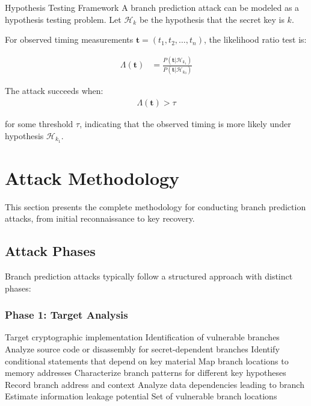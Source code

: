 \documentclass[11pt,a4paper]{article}
\theoremstyle{definition}
\begin{document}
\begin{mathematicsbox}{Hypothesis Testing Framework}
A branch prediction attack can be modeled as a hypothesis testing problem. Let $\mathcal{H}_k$ be the hypothesis that the secret key is $k$.

For observed timing measurements $\mathbf{t} = (t_1, t_2, \ldots, t_n)$, the likelihood ratio test is:

\begin{align}
\Lambda(\mathbf{t}) &= \frac{P(\mathbf{t}|\mathcal{H}_{k_1})}{P(\mathbf{t}|\mathcal{H}_{k_0})}
\end{align}

The attack succeeds when:
\begin{align}
\Lambda(\mathbf{t}) > \tau
\end{align}

for some threshold $\tau$, indicating that the observed timing is more likely under hypothesis $\mathcal{H}_{k_1}$.
\end{mathematicsbox}

\section{Attack Methodology}

This section presents the complete methodology for conducting branch prediction attacks, from initial reconnaissance to key recovery.

\subsection{Attack Phases}

Branch prediction attacks typically follow a structured approach with distinct phases:

\subsubsection{Phase 1: Target Analysis}

\begin{algorithm}
\caption{Target Analysis Phase}
\begin{algorithmic}[1]
\REQUIRE Target cryptographic implementation
\ENSURE Identification of vulnerable branches
\STATE Analyze source code or disassembly for secret-dependent branches
\STATE Identify conditional statements that depend on key material
\STATE Map branch locations to memory addresses
\STATE Characterize branch patterns for different key hypotheses
    \STATE Record branch address and context
    \STATE Analyze data dependencies leading to branch
    \STATE Estimate information leakage potential
\ENDFOR
\RETURN Set of vulnerable branch locations
\end{algorithmic}
\end{algorithm}
\end{document}

